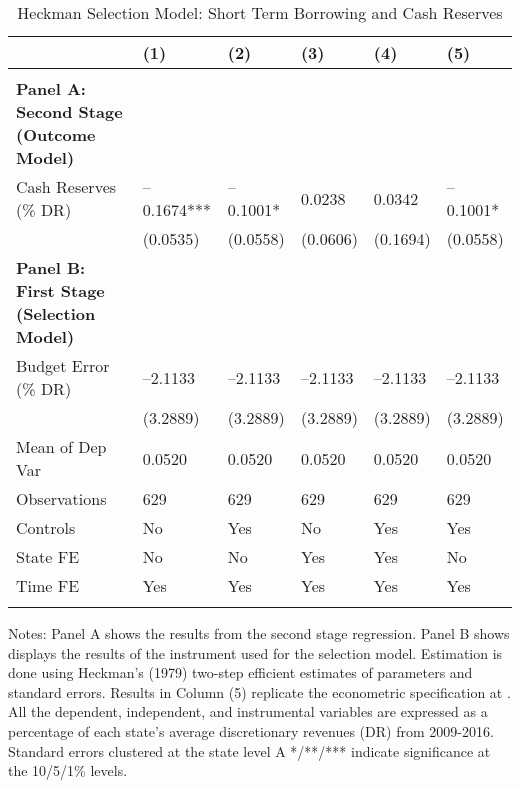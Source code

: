 \documentclass{article}
\begin{document}
\begin{table}[tbp] \centering
{}

\caption{Heckman Selection Model: Short Term Borrowing and Cash Reserves}
\label{tab:Regression_StDebt}
\begin{tabularx}{\linewidth}{lCCCCC}

\toprule
&{(1)}&{(2)}&{(3)}&{(4)}&{(5)} \tabularnewline \midrule
{}&{}&{}&{}&{}&{} \tabularnewline
\midrule \addlinespace[\belowrulesep]
\textbf{Panel A: Second Stage (Outcome Model)}&&&&& \tabularnewline
\midrule Cash Reserves (\% DR)&--0.1674***&--0.1001*&0.0238&0.0342&--0.1001* \tabularnewline
&(0.0535)&(0.0558)&(0.0606)&(0.1694)&(0.0558) \tabularnewline
\midrule \textbf{Panel B: First Stage (Selection Model)}&&&&& \tabularnewline
Budget Error (\% DR)&--2.1133&--2.1133&--2.1133&--2.1133&--2.1133 \tabularnewline
&(3.2889)&(3.2889)&(3.2889)&(3.2889)&(3.2889) \tabularnewline
Mean of Dep Var&0.0520&0.0520&0.0520&0.0520&0.0520 \tabularnewline
\midrule Observations&629&629&629&629&629 \tabularnewline
Controls&No&Yes&No&Yes&Yes \tabularnewline
State FE&No&No&Yes&Yes&No \tabularnewline
Time FE&Yes&Yes&Yes&Yes&Yes \tabularnewline
\bottomrule \addlinespace[\belowrulesep]

\end{tabularx}
\begin{flushleft}
\footnotesize Notes: Panel A shows the results from the second stage regression. Panel B shows displays the results of the instrument used for the selection model. Estimation is done using Heckman's (1979) two-step efficient estimates of parameters and standard errors. Results in Column (5) replicate the econometric specification at \citep{suDoesFinancialSlack2018}. All the dependent, independent, and instrumental variables are expressed as a percentage of each state's average discretionary revenues (DR) from 2009-2016. Standard errors clustered at the state level A */**/*** indicate significance at the 10/5/1\% levels.
\end{flushleft}
\end{table}
\end{document}
